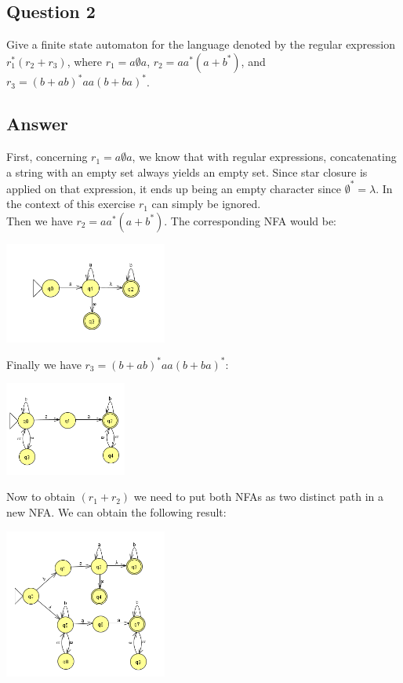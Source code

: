 \newpage
\subsection*{Question 2}
\noindent [5 pts] Give a finite state automaton for the language denoted by the regular expression $r_1^*(r_2 + r_3)$, where $r_1 = a\emptyset a$, 
$r_2 = aa^*(a + b^*)$, and $r_3 = (b + ab)^*aa(b + ba)^*$.

\subsection*{Answer}
\noindent First, concerning $r_1 = a\emptyset a$, we know that with regular expressions, concatenating a string with an empty set always yields an empty set.
Since star closure is applied on that expression, it ends up being an empty character since $\emptyset ^* = \lambda$. In the context of this exercise $r_1$ 
can simply be ignored. \\

\noindent Then we have $r_2 = aa^*(a + b^*)$.
\noindent The corresponding NFA would be:
\begin{center}
    \includegraphics[width=0.4\textwidth]{img/graph1.png}
\end{center}

\noindent Finally we have $r_3 = (b + ab)^*aa(b + ba)^*$:

\begin{center}
    \includegraphics[width=0.3\textwidth]{img/graph2.png}
\end{center}

\noindent Now to obtain $(r_1 + r_2)$ we need to put both NFAs as two distinct path in a new NFA. We can obtain the following result:
\begin{center}
    \includegraphics[width=0.4\textwidth]{img/graph3.png}
\end{center}


